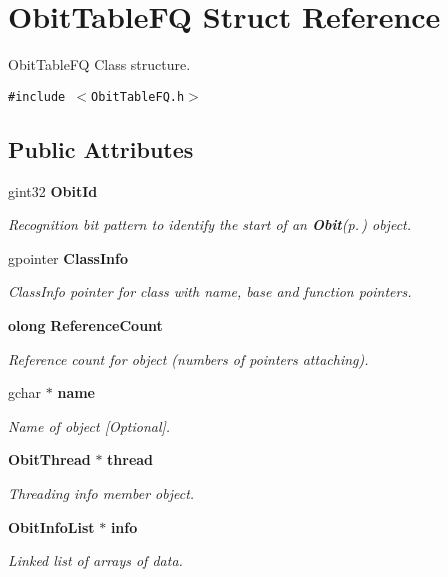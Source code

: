\section{Obit\-Table\-FQ Struct Reference}
\label{structObitTableFQ}
Obit\-Table\-FQ Class structure.  


{\tt \#include $<$Obit\-Table\-FQ.h$>$}

\subsection*{Public Attributes}
\begin{CompactItemize}
\item 
gint32 {\bf Obit\-Id}
\begin{CompactList}\small\item\em Recognition bit pattern to identify the start of an {\bf Obit}{\rm (p.\,\pageref{structObit})} object. \item\end{CompactList}\item 
gpointer {\bf Class\-Info}
\begin{CompactList}\small\item\em Class\-Info pointer for class with name, base and function pointers. \item\end{CompactList}\item 
{\bf olong} {\bf Reference\-Count}
\begin{CompactList}\small\item\em Reference count for object (numbers of pointers attaching). \item\end{CompactList}\item 
gchar $\ast$ {\bf name}
\begin{CompactList}\small\item\em Name of object [Optional]. \item\end{CompactList}\item 
{\bf Obit\-Thread} $\ast$ {\bf thread}
\begin{CompactList}\small\item\em Threading info member object. \item\end{CompactList}\item 
{\bf Obit\-Info\-List} $\ast$ {\bf info}
\begin{CompactList}\small\item\em Linked list of arrays of data. \item\end{CompactList}\item 

\end{CompactItemize}
